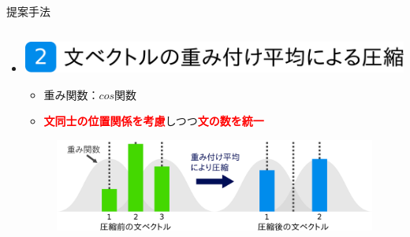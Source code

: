 \documentclass[unicode,10pt]{beamer}
\newlength{\mycolumnwidth}
\newlength{\mytitlefigureheight}
\newcommand{\itemtitle}[1]{\textbf{#1}\\}
\newcommand{\fire}[1]{\textcolor{red}{\textbf{#1}}}
\newcommand{\doublecolumns}[4]{
    \begin{minipage}[t]{#1}
      #2
    \end{minipage}
    \begin{minipage}[t]{#3}
      #4
    \end{minipage}}
\begin{document}
\begin{frame}[t]
\begin{block}{提案手法}
\begin{columns}[onlytextwidth,t]
    \begin{column}{\mycolumnwidth}
      \begin{itemize}
        \item \itemtitle{\includegraphics[height=\mytitlefigureheight]
                                         {fig/poster_model_title_2.pdf}}
          \begin{itemize}
            \item 重み関数：$cos$関数
            \item \fire{文同士の位置関係を考慮}しつつ\fire{文の数を統一}
          \end{itemize}
          \begin{figure}
            \includegraphics[width=0.9\linewidth]
                            {fig/what_are_you_weighting_for.pdf}
          \end{figure}

\end{itemize}
\end{column}
\end{columns}
\end{block}
\end{frame}
\end{document}
